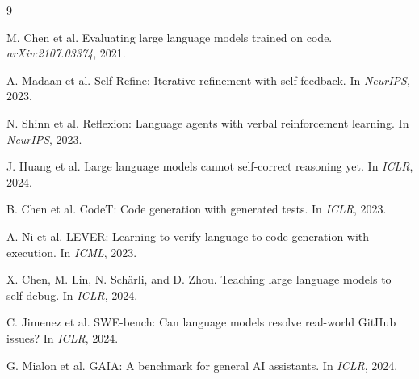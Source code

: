\documentclass{article}
\begin{document}
\begin{thebibliography}{9}

M. Chen et al.
\newblock Evaluating large language models trained on code.
\newblock \emph{arXiv:2107.03374}, 2021.

A. Madaan et al.
\newblock Self-Refine: Iterative refinement with self-feedback.
\newblock In \emph{NeurIPS}, 2023.

N. Shinn et al.
\newblock Reflexion: Language agents with verbal reinforcement learning.
\newblock In \emph{NeurIPS}, 2023.

J. Huang et al.
\newblock Large language models cannot self-correct reasoning yet.
\newblock In \emph{ICLR}, 2024.

B. Chen et al.
\newblock CodeT: Code generation with generated tests.
\newblock In \emph{ICLR}, 2023.

A. Ni et al.
\newblock LEVER: Learning to verify language-to-code generation with execution.
\newblock In \emph{ICML}, 2023.

X. Chen, M. Lin, N. Sch\"arli, and D. Zhou.
\newblock Teaching large language models to self-debug.
\newblock In \emph{ICLR}, 2024.

C. Jimenez et al.
\newblock SWE-bench: Can language models resolve real-world GitHub issues?
\newblock In \emph{ICLR}, 2024.

G. Mialon et al.
\newblock GAIA: A benchmark for general AI assistants.
\newblock In \emph{ICLR}, 2024.

\end{thebibliography}
\end{document}
